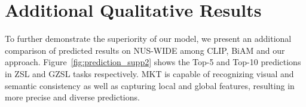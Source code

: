\documentclass[letterpaper]{article} \usepackage{aaai23}  \usepackage{times}  \usepackage{helvet}  \usepackage{courier}  \usepackage[hyphens]{url}  \usepackage{graphicx} \urlstyle{rm} \def\UrlFont{\rm}  \usepackage{natbib}  \usepackage{caption} \frenchspacing  \setlength{\pdfpagewidth}{8.5in}  \setlength{\pdfpageheight}{11in}
\begin{document}
\section{Additional Qualitative Results}
\label{section:Additional Qualitative Results}
To further demonstrate the superiority of our model, we present an additional comparison of predicted results on NUS-WIDE among CLIP, BiAM and our approach.
Figure~\ref{fig:prediction_supp2} shows the Top-5 and Top-10 predictions in ZSL and GZSL tasks respectively.
MKT is capable of recognizing visual and semantic consistency as well as capturing local and global features, resulting in more precise and diverse predictions.
\end{document}
